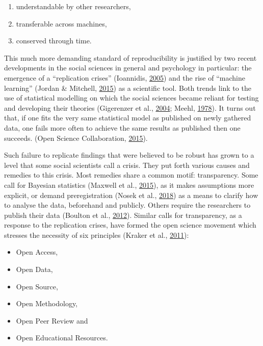 \documentclass[12pt,a4paper,]{article}
\providecommand{\tightlist}{%
  \setlength{\itemsep}{0pt}\setlength{\parskip}{0pt}}
\begin{document}
\begin{enumerate}
\def\labelenumi{\arabic{enumi}.}
\tightlist
\item
  understandable by other researchers,
\item
  transferable across machines,
\item
  conserved through time.
\end{enumerate}

This much more demanding standard of reproducibility is justified by two recent developments in the social sciences in general and psychology in particular: the emergence of a ``replication crises'' (Ioannidis, \protect\hyperlink{ref-ioannidisWhyMostPublished2005}{2005}) and the rise of ``machine learning'' (Jordan \& Mitchell, \protect\hyperlink{ref-jordanMachineLearningTrends2015}{2015}) as a scientific tool.
Both trends link to the use of statistical modelling on which the social sciences became reliant for testing and developing their theories (Gigerenzer et al., \protect\hyperlink{ref-gigerenzerNullRitualWhat2004}{2004}; Meehl, \protect\hyperlink{ref-meehlTheoreticalRisksTabular1978}{1978}).
It turns out that, if one fits the very same statistical model as published on newly gathered data, one fails more often to achieve the same results as published then one succeeds. (Open Science Collaboration, \protect\hyperlink{ref-opensciencecollaborationEstimatingReproducibilityPsychological2015}{2015}).

Such failure to replicate findings that were believed to be robust has grown to a level that some social scientists call a crisis.
They put forth various causes and remedies to this crisis.
Most remedies share a common motif: transparency.
Some call for Bayesian statistics (Maxwell et al., \protect\hyperlink{ref-maxwellPsychologySufferingReplication2015}{2015}), as it makes assumptions more explicit, or demand preregistration (Nosek et al., \protect\hyperlink{ref-nosekPreregistrationRevolution2018}{2018}) as a means to clarify how to analyse the data, beforehand and publicly. Others require the researchers to publish their data (Boulton et al., \protect\hyperlink{ref-boultonScienceOpenEnterprise2012}{2012}).
Similar calls for transparency, as a response to the replication crises, have formed the open science movement which stresses the necessity of six principles (Kraker et al., \protect\hyperlink{ref-krakerCaseOpenScience2011}{2011}):

\begin{itemize}
\tightlist
\item
  Open Access,
\item
  Open Data,
\item
  Open Source,
\item
  Open Methodology,
\item
  Open Peer Review and
\item
  Open Educational Resources.
\end{itemize}
\end{document}

